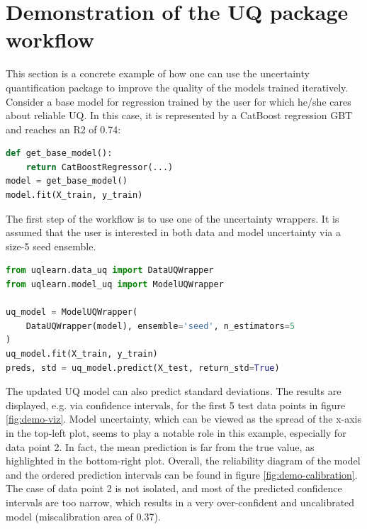\section{Demonstration of the UQ package workflow}

This section is a concrete example of how one can use the uncertainty quantification package to improve the quality of the models trained iteratively. Consider a base model for regression trained by the user for which he/she cares about reliable UQ. In this case, it is represented by a CatBoost regression GBT and reaches an R2 of 0.74:

\begin{lstlisting}[language=Python, caption=Base user model.]
def get_base_model():
    return CatBoostRegressor(...)
model = get_base_model()
model.fit(X_train, y_train)
\end{lstlisting}

The first step of the workflow is to use one of the uncertainty wrappers. It is assumed that the user is interested in both data and model uncertainty via a size-5 seed ensemble.

\begin{lstlisting}[language=Python, caption=Step 1: train UQ model.]
from uqlearn.data_uq import DataUQWrapper
from uqlearn.model_uq import ModelUQWrapper

uq_model = ModelUQWrapper(
    DataUQWrapper(model), ensemble='seed', n_estimators=5
)
uq_model.fit(X_train, y_train)
preds, std = uq_model.predict(X_test, return_std=True)
\end{lstlisting}

The updated UQ model can also predict standard deviations. The results are displayed, e.g. via confidence intervals, for the first 5 test data points in figure \ref{fig:demo-viz}. Model uncertainty, which can be viewed as the spread of the x-axis in the top-left plot,  seems to play a notable role in this example, especially for data point 2. In fact, the mean prediction is far from the true value, as highlighted in the bottom-right plot. Overall, the reliability diagram of the model and the ordered prediction intervals can be found in figure \ref{fig:demo-calibration}. The case of data point 2 is not isolated, and most of the predicted confidence intervals are too narrow, which results in a very over-confident and uncalibrated model (miscalibration area of 0.37).

